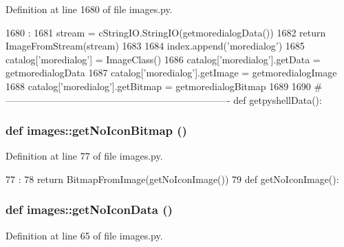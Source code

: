 Definition at line 1680 of file images.py.


\begin{DoxyCode}
1680                         :
1681     stream = cStringIO.StringIO(getmoredialogData())
1682     return ImageFromStream(stream)
1683 
1684 index.append('moredialog')
1685 catalog['moredialog'] = ImageClass()
1686 catalog['moredialog'].getData = getmoredialogData
1687 catalog['moredialog'].getImage = getmoredialogImage
1688 catalog['moredialog'].getBitmap = getmoredialogBitmap
1689 
1690 #----------------------------------------------------------------------
def getpyshellData():
\end{DoxyCode}
\hypertarget{namespaceimages_af988b4cc715973071d3fbac0012e32e2}{
\subsubsection[{getNoIconBitmap}]{\setlength{\rightskip}{0pt plus 5cm}def images::getNoIconBitmap ()}}
\label{namespaceimages_af988b4cc715973071d3fbac0012e32e2}


Definition at line 77 of file images.py.


\begin{DoxyCode}
77                      :
78     return BitmapFromImage(getNoIconImage())
79 
def getNoIconImage():
\end{DoxyCode}
\hypertarget{namespaceimages_a4e09de9b1992cddec08a5a335fc44c81}{
\subsubsection[{getNoIconData}]{\setlength{\rightskip}{0pt plus 5cm}def images::getNoIconData ()}}
\label{namespaceimages_a4e09de9b1992cddec08a5a335fc44c81}


Definition at line 65 of file images.py.


